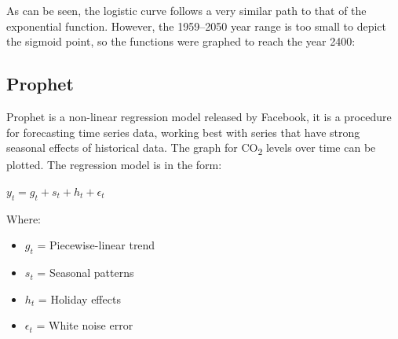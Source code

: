 \documentclass{mcmthesis}
\begin{document}
    As can be seen, the logistic curve follows a very similar path to that of the exponential function. However, the 1959--2050 year range is too small to depict the sigmoid point, so the functions were graphed to reach the year 2400:

    \begin{center}
    \end{center}

    \subsection{Prophet}
    Prophet is a non-linear regression model released by Facebook, it is a procedure for forecasting time series data, working best with series that have strong seasonal effects of historical data. The graph for CO\textsubscript{2} levels over time can be plotted. The regression model is in the form:

    ${\displaystyle y_t = g_t + s_t + h_t +\epsilon_t}$

    Where:
    \begin{itemize}
        \item ${g_t}$ = Piecewise-linear trend
        \item ${s_t}$ = Seasonal patterns
        \item ${h_t}$ = Holiday effects
        \item ${\epsilon_t}$ = White noise error
    \end{itemize}
\end{document}
